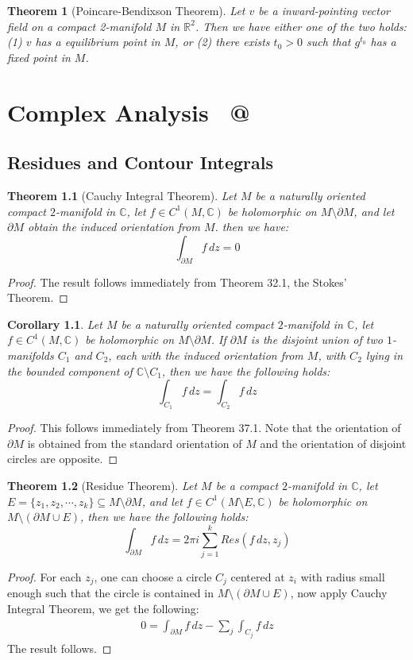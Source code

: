 \documentclass[15pt]{book}
\makeatletter
\theoremstyle{break}
\theoremstyle{break}
\newtheorem{thm}{Theorem}[section]
\newtheorem{corT}[lem]{Corollary}
\newcommand{\R}{\mathbb{R}}
\newcommand{\Complex}{\mathbb{C}}
\newcommand*{\rom}[1]{\expandafter\@slowromancap\romannumeral #1@}
\makeatother
\begin{document}
\begin{thm}[Poincare-Bendixson Theorem]
Let $v$ be a inward-pointing vector field on a compact 2-manifold $M$ in $\R^2$. Then we have either one of the two holds: (1) $v$ has a equilibrium point in $M$, or (2) there exists $t_0 > 0$ such that $g^{t_0}$ has a fixed point in $M$. 
\end{thm}


\newpage
\chapter{Complex Analysis \ \rom{2}}
\setcounter{section}{36}
\section[Residues and Contour Integrals]{\color{red}Residues and Contour Integrals\color{black}}
\begin{thm}[Cauchy Integral Theorem]
Let $M$ be a naturally oriented compact $2$-manifold in $\Complex$, let $f \in C^1(M, \Complex)$ be holomorphic on $M \setminus \partial M$, and let $\partial M$ obtain the induced orientation from $M$. then we have: 
$$\int_{\partial M}f\, dz = 0$$ 
\end{thm}
\begin{proof}
The result follows immediately from Theorem 32.1, the Stokes' Theorem.
\end{proof}

\begin{corT}
Let $M$ be a naturally oriented compact $2$-manifold in $\Complex$, let $f \in C^1 ( M,\Complex)$ be holomorphic on $M\setminus \partial M$. If $\partial M$ is the disjoint union of two $1$-manifolds $C_1$ and $C_2$, each with the induced orientation from $M$, with $C_2$ lying in the bounded component of $\Complex \setminus C_1$, then we have the following holds:
$$\int_{C_1}f \, dz = \int_{C_2} f\, dz$$
\end{corT}
\begin{proof}
This follows immediately from Theorem 37.1. Note that the orientation of $\partial M$ is obtained from the standard orientation of $M$ and the orientation of disjoint circles are opposite.
\end{proof}


\begin{thm}[Residue Theorem]
Let $M$ be a compact $2$-manifold in $\Complex$, let $E = \{z_1,z_2,\cdots, z_k\} \subseteq M\setminus \partial M$, and let $f\in C^1(M\setminus E, \Complex)$ be holomorphic on $M \setminus (\partial M\cup E)$, then we have the following holds:
$$\int_{\partial M}f\, dz = 2\pi i \sum_{j=1}^k Res(f\, dz, z_j)$$ 
\end{thm}
\begin{proof}
For each $z_j$, one can choose a circle $C_j$ centered at $z_i$ with radius small enough such that the circle is contained in $M\setminus (\partial M\cup E)$, now apply Cauchy Integral Theorem, we get the following:
\begin{align*}
0 = \int_{\partial M}f\, dz - \sum_j \int_{C_j}f\, dz
\end{align*}
The result follows.
\end{proof}
\end{document}
